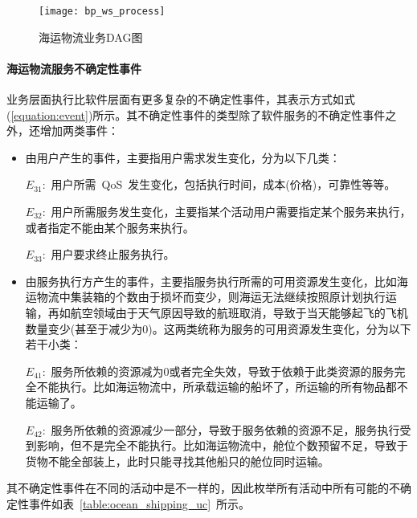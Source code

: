 \begin{figure}[htbp]
    \centering
    \texttt{[image: bp\_ws\_process]}
    \caption{海运物流业务DAG图}\label{figure:bp_ws_process}
    \vspace{-1em}
\end{figure}

\paragraph{海运物流服务不确定性事件}

业务层面执行比软件层面有更多复杂的不确定性事件，其表示方式如式(\ref{equation:event})所示。其不确定性事件的类型除了软件服务的不确定性事件之外，还增加两类事件：

\begin{itemize}
    
    \item 由用户产生的事件，主要指用户需求发生变化，分为以下几类：
    
    $E_{31}$:~用户所需~QoS~发生变化，包括执行时间，成本(价格)，可靠性等等。
    
    $E_{32}$:~用户所需服务发生变化，主要指某个活动用户需要指定某个服务来执行，或者指定不能由某个服务来执行。
    
    $E_{33}$:~用户要求终止服务执行。
    
    \item 由服务执行方产生的事件，主要指服务执行所需的可用资源发生变化，比如海运物流中集装箱的个数由于损坏而变少，则海运无法继续按照原计划执行运输，再如航空领域由于天气原因导致的航班取消，导致于当天能够起飞的飞机数量变少(甚至于减少为0)。这两类统称为服务的可用资源发生变化，分为以下若干小类：
    
    $E_{41}$:~服务所依赖的资源减为0或者完全失效，导致于依赖于此类资源的服务完全不能执行。比如海运物流中，所承载运输的船坏了，所运输的所有物品都不能运输了。
    
    $E_{42}$:~服务所依赖的资源减少一部分，导致于服务依赖的资源不足，服务执行受到影响，但不是完全不能执行。比如海运物流中，舱位个数预留不足，导致于货物不能全部装上，此时只能寻找其他船只的舱位同时运输。
    
    
\end{itemize}

其不确定性事件在不同的活动中是不一样的，因此枚举所有活动中所有可能的不确定性事件如表~\ref{table:ocean_shipping_uc}~所示。

